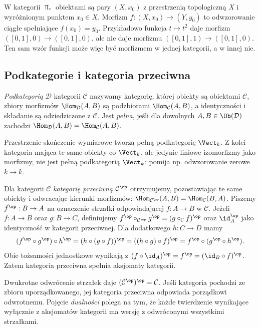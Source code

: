 \begin{przyklad}
W kategorii $\Top_*$ obiektami są pary $(X,x_0)$ z przestrzenią topologiczną $X$ i wyróżnionym punktem $x_0\in X$. Morfizm $f:(X,x_0)\to(Y,y_0)$ to odwzorowanie ciągłe spełniające $f(x_0)=y_0$. Przykładowo funkcja $t\mapsto t^2$ daje morfizm $([0,1],0)\to([0,1],0)$, ale nie daje morfizmu $([0,1],1)\to([0,1],0)$. Ten sam wzór funkcji może więc być morfizmem w jednej kategorii, a w innej nie.
\end{przyklad}

\subsection{Podkategorie i kategoria przeciwna}

\begin{definicja}[Podkategoria]
\emph{Podkategorią} $\mathcal D$ kategorii $\mathcal C$ nazywamy kategorię, której obiekty są obiektami $\mathcal C$, zbiory morfizmów $\Hom_{\mathcal D}(A,B)$ są podzbiorami $\Hom_{\mathcal C}(A,B)$, a identyczności i składanie są odziedziczone z $\mathcal C$. Jest \emph{pełna}, jeśli dla dowolnych $A,B\in\Ob(\mathcal D)$ zachodzi $\Hom_{\mathcal D}(A,B)=\Hom_{\mathcal C}(A,B)$.
\end{definicja}

\begin{przyklad}
Przestrzenie skończenie wymiarowe tworzą pełną podkategorię $\Vect_k$. Z kolei kategoria mająca te same obiekty co $\Vect_k$, ale jedynie liniowe izomorfizmy jako morfizmy, nie jest pełną podkategorią $\Vect_k$: pomija np. odwzorowanie zerowe $k\to k$.
\end{przyklad}

\begin{definicja}\label{def:op}
Dla kategorii $\mathcal C$ \emph{kategorię przeciwną} $\mathcal C^{\op}$ otrzymujemy, pozostawiając te same obiekty i odwracając kierunki morfizmów: $\Hom_{\mathcal C^{\op}}(A,B)=\Hom_{\mathcal C}(B,A)$. Piszemy $f^{\op}:B\to A$ na oznaczenie strzałki odpowiadającej $f:A\to B$ w $\mathcal C$. Jeżeli $f:A\to B$ oraz $g:B\to C$, definiujemy $f^{\op}\circ_{\mathcal C^{\op}}g^{\op}=(g\circ_{\mathcal C}f)^{\op}$ oraz $\id_A^{\op}$ jako identyczność w kategorii przeciwnej. Dla dodatkowego $h:C\to D$ mamy
\[
(f^{\op}\circ g^{\op})\circ h^{\op}
=(h\circ(g\circ f))^{\op}
=((h\circ g)\circ f)^{\op}
=f^{\op}\circ(g^{\op}\circ h^{\op}).
\]
Obie tożsamości jednostkowe wynikają z $(f\circ\id_A)^{\op}=f^{\op}=(\id_B\circ f)^{\op}$. Zatem kategoria przeciwna spełnia aksjomaty kategorii.
\end{definicja}

\begin{uwaga}
Dwukrotne odwrócenie strzałek daje $(\mathcal C^{\op})^{\op}=\mathcal C$. Jeśli kategoria pochodzi ze zbioru uporządkowanego, jej kategoria przeciwna odpowiada porządkowi odwrotnemu. Pojęcie \emph{dualności} polega na tym, że każde twierdzenie wynikające wyłącznie z aksjomatów kategorii ma wersję z odwróconymi wszystkimi strzałkami.
\end{uwaga}

